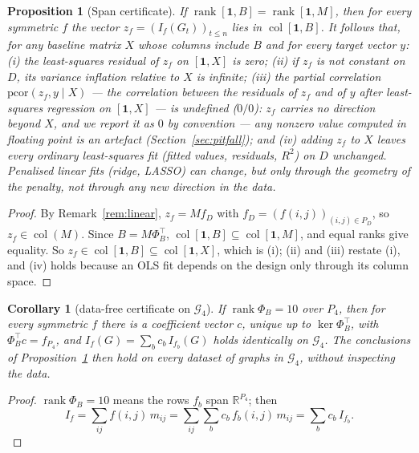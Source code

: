 \documentclass[11pt,a4paper]{article}
\newtheorem{proposition}[theorem]{Proposition}
\newtheorem{corollary}[theorem]{Corollary}
\theoremstyle{definition}
\newcommand{\pcor}{\mathrm{pcor}}
\newcommand{\Gc}{\mathcal{G}}
\newcommand{\col}{\operatorname{col}}
\begin{document}
\begin{proposition}[Span certificate]\label{prop:cert}
If $\operatorname{rank}[\mathbf 1, B]=\operatorname{rank}[\mathbf 1,M]$,
then for every symmetric $f$ the vector $z_f=(I_f(G_t))_{t\le n}$
lies in $\col[\mathbf 1,B]$. It follows that, for any baseline matrix
$X$ whose columns include $B$ and for every target vector $y$:
(i) the least-squares residual of $z_f$ on $[\mathbf 1,X]$ is zero;
(ii) if $z_f$ is not constant on $D$, its variance inflation relative to
$X$ is infinite;
(iii) the partial correlation $\pcor(z_f,y\mid X)$ --- the correlation
between the residuals of $z_f$ and of $y$ after least-squares regression
on $[\mathbf 1,X]$ --- is undefined ($0/0$):
$z_f$ carries no direction beyond $X$, and we report it as $0$ by
convention --- any nonzero value computed in floating point is an
artefact (Section~\ref{sec:pitfall}); and
(iv) adding $z_f$ to $X$ leaves every ordinary least-squares fit
(fitted values, residuals, $R^2$) on $D$ unchanged. Penalised linear
fits (ridge, LASSO) can change, but only through the geometry of the
penalty, not through any new direction in the data.
\end{proposition}

\begin{proof}
By Remark~\ref{rem:linear}, $z_f=Mf_D$ with $f_D=(f(i,j))_{(i,j)\in P_D}$,
so $z_f\in\col(M)$. Since $B=M\Phi_B^{\top}$, $\col[\mathbf 1,B]\subseteq\col[\mathbf 1,M]$,
and equal ranks give equality. So $z_f\in\col[\mathbf 1,B]\subseteq\col[\mathbf 1,X]$,
which is (i); (ii) and (iii) restate (i), and (iv) holds because an
OLS fit depends on the design only through its column space.
\end{proof}

\begin{corollary}[data-free certificate on $\Gc_4$]\label{cor:datafree}
If $\operatorname{rank}\Phi_B=10$ over $P_4$, then for every symmetric
$f$ there is a coefficient vector $c$, unique up to $\ker \Phi_B^{\top}$, with
$\Phi_B^{\top}c=f_{P_4}$, and $I_f(G)=\sum_b c_b\,I_{f_b}(G)$ holds
\emph{identically} on $\Gc_4$. The conclusions of
Proposition~\ref{prop:cert} then hold on every dataset of graphs in
$\Gc_4$, without inspecting the data.
\end{corollary}

\begin{proof}
$\operatorname{rank}\Phi_B=10$ means the rows $f_b$ span
$\mathbb{R}^{P_4}$; then
\[
I_f=\sum_{ij}f(i,j)\,m_{ij}=\sum_{ij}\sum_b c_b\, f_b(i,j)\, m_{ij}=\sum_b c_b\, I_{f_b}.
\]
\end{proof}
\end{document}
